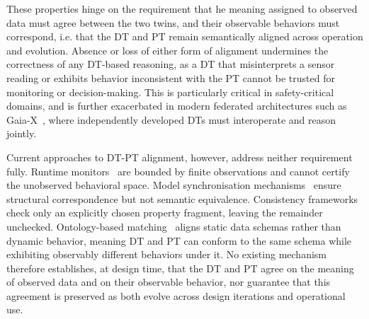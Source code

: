 
These properties hinge on the requirement that he meaning assigned to observed data must agree between the two twins, and their observable behaviors must correspond, i.e. that the DT and PT remain semantically aligned across operation and evolution. Absence or loss of either form of alignment undermines the correctness of any DT-based reasoning, as a DT that misinterprets a sensor reading or exhibits behavior inconsistent with the PT cannot be trusted for monitoring or decision-making. This is particularly critical in safety-critical domains, and is further exacerbated in modern federated architectures such as Gaia-X~\cite{Gaiax2020}, where independently developed DTs must interoperate and reason jointly.





Current approaches to DT-PT alignment, however, address neither requirement fully. Runtime monitors~\cite{10.1145/3652620.3688267} are bounded by finite observations and cannot certify the unobserved behavioral space. Model synchronisation mechanisms~\cite{lehner2021aml4dt, Mertens2024} ensure structural correspondence but not semantic equivalence. Consistency frameworks~\cite{kamburjan2022twinningbyconstruction, Gil2025} check only an explicitly chosen property fragment, leaving the remainder unchecked. Ontology-based matching~\cite{10.1016/j.rcim.2023.102649, KARABULUT2024442} aligns static data schemas rather than dynamic behavior, meaning DT and PT can conform to the same schema while exhibiting observably different behaviors under it. No existing mechanism therefore establishes, at design time, that the DT and PT agree on the meaning of observed data and on their observable behavior, nor guarantee that this agreement is preserved as both evolve across design iterations and operational use.

